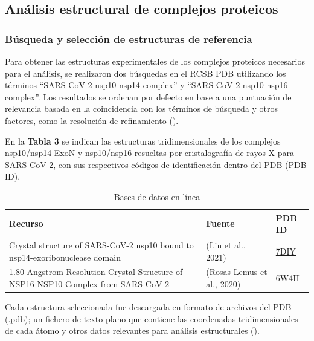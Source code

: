\subsection{Análisis estructural de complejos proteicos}

\subsubsection{Búsqueda y selección de estructuras de referencia}

Para obtener las estructuras experimentales de los complejos proteicos 
necesarios para el análisis, se realizaron dos búsquedas en el RCSB PDB 
utilizando los términos ``SARS-CoV-2 nsp10 nsp14 complex'' y ``SARS-CoV-2 
nsp10 nsp16 complex''. Los resultados se ordenan por defecto en base a una 
puntuación de relevancia basada en la coincidencia con los términos de 
búsqueda y otros factores, como la resolución de refinamiento
(\cite{rose_rcsb_2021}).

En la \textbf{Tabla 3} se indican las estructuras tridimensionales de los 
complejos nsp10/nsp14-ExoN y nsp10/nsp16 resueltas por cristalografía de 
rayos X para SARS-CoV-2, con sus respectivos códigos de identificación 
dentro del PDB (PDB ID).

\begin{table}[H]
    \centering
    \caption{Bases de datos en línea}\label{structures}
    \scriptsize
    \setlength{\tabcolsep}{20pt} %
    \begin{tabularx}{\textwidth}{@{}p{7cm}p{4cm}X@{}}
    \toprule
    \textbf{Recurso} & \textbf{Fuente} & \textbf{PDB ID} \\ 
    \midrule
    Crystal structure of SARS-CoV-2 nsp10 bound to nsp14-exoribonuclease domain & (Lin et al., 2021) & \href{https://www.rcsb.org/structure/7DIY}{7DIY} \\
    1.80 Angstrom Resolution Crystal Structure of NSP16-NSP10 Complex from SARS-CoV-2 & (Rosas-Lemus et al., 2020) & \href{https://www.rcsb.org/structure/6W4H}{6W4H} \\ 
    \bottomrule
    \end{tabularx}
\end{table}

Cada estructura seleccionada fue descargada en formato de archivos del PDB 
(.pdb); un fichero de texto plano que contiene las coordenadas 
tridimensionales de cada átomo y otros datos relevantes para análisis 
estructurales (\cite{green_pdb101_2019}).

